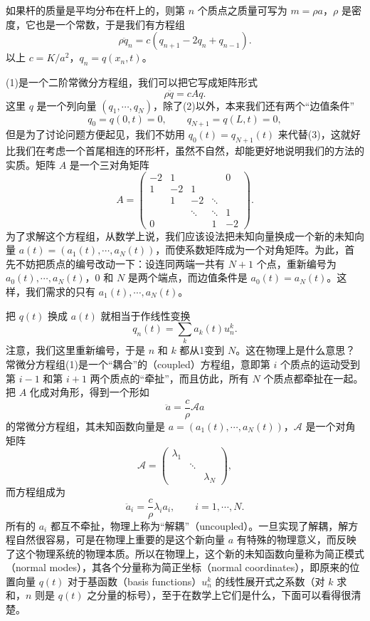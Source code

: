 如果杆的质量是平均分布在杆上的，则第 $n$ 个质点之质量可写为 $m=\rho a$，$\rho$ 是密度，它也是一个常数，于是我们有方程组
\begin{equation}
 \rho\ddot q_n=c(q_{n+1}-2q_n+q_{n-1}).
 \tag{1}
\end{equation}
以上 $c=K/a^2$，$q_n=q(x_n,t)$。

(1)是一个二阶常微分方程组，我们可以把它写成矩阵形式
\begin{equation}
 \rho\ddot q=cAq.
 \tag{2}
\end{equation}
这里 $q$ 是一个列向量 $(q_1,\cdots,q_N)$，除了(2)以外，本来我们还有两个“边值条件”
\begin{equation}
 q_0=q(0,t)=0,\qquad q_{N+1}=q(L,t)=0,
 \tag{3}
\end{equation}
但是为了讨论问题方便起见，我们不妨用 $q_0(t)=q_{N+1}(t)$ 来代替(3)，这就好比我们在考虑一个首尾相连的环形杆，虽然不自然，却能更好地说明我们的方法的实质。矩阵 $A$ 是一个三对角矩阵
\begin{equation}
 A=
 \begin{pmatrix}
 -2&1&&&0\\
 1&-2&1&&\\
 &1&-2&\ddots&\\
 &&\ddots&\ddots&1\\
 0&&&1&-2
 \end{pmatrix}.
 \tag{4}
\end{equation}
为了求解这个方程组，从数学上说，我们应该设法把未知向量换成一个新的未知向量 $a(t)=(a_1(t),\cdots,a_N(t))$，而使系数矩阵成为一个对角矩阵。为此，首先不妨把质点的编号改动一下：设连同两端一共有 $N+1$ 个点，重新编号为 $a_0(t),\cdots,a_N(t)$，$0$ 和 $N$ 是两个端点，而边值条件是 $a_0(t)=a_N(t)$。这样，我们需求的只有 $a_1(t),\cdots,a_N(t)$。

把 $q(t)$ 换成 $a(t)$ 就相当于作线性变换
\begin{equation}
 q_n(t)=\sum_k a_k(t)u_n^k.
 \tag{5}
\end{equation}
注意，我们这里重新编号，于是 $n$ 和 $k$ 都从1变到 $N$。这在物理上是什么意思？常微分方程组(1)是一个“耦合”的（coupled）方程组，意即第 $i$ 个质点的运动受到第 $i-1$ 和第 $i+1$ 两个质点的“牵扯”，而且仿此，所有 $N$ 个质点都牵扯在一起。把 $A$ 化成对角形，得到一个形如
\[
 \ddot a=\frac{c}{\rho}\mathcal A a
\]
的常微分方程组，其未知函数向量是 $a=(a_1(t),\cdots,a_N(t))$，$\mathcal A$ 是一个对角矩阵
\[
 \mathcal A=\begin{pmatrix}
 \lambda_1&&\\
 &\ddots&\\
 &&\lambda_N
 \end{pmatrix},
\]
而方程组成为
\begin{equation}
 \ddot a_i=\frac{c}{\rho}\lambda_i a_i,\qquad i=1,\cdots,N.
 \tag{6}
\end{equation}
所有的 $a_i$ 都互不牵扯，物理上称为“解耦”（uncoupled）。一旦实现了解耦，解方程自然很容易，可是在物理上重要的是这个新向量 $a$ 有特殊的物理意义，而反映了这个物理系统的物理本质。所以在物理上，这个新的未知函数向量称为简正模式（normal modes），其各个分量称为简正坐标（normal coordinates），即原来的位置向量 $q(t)$ 对于基函数（basis functions）$u_n^k$ 的线性展开式之系数（对 $k$ 求和，$n$ 则是 $q(t)$ 之分量的标号），至于在数学上它们是什么，下面可以看得很清楚。

